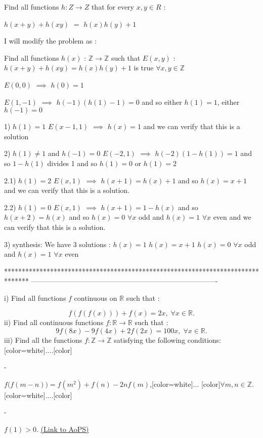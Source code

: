\begin{solution}
	\begin{tcolorbox}Find all functions $ h : Z \longrightarrow Z$ that for every $ x,y \in R$ :

$ h(x + y) + h(xy)$ $ =$ $ h(x)h(y) + 1$\end{tcolorbox}

I will modify the problem as :

Find all functions $ h(x)$ : $ \mathbb{Z}\longrightarrow\mathbb{Z}$ such that $ E(x,y)$ : $ h(x + y) + h(xy) = h(x)h(y) + 1$ is true $ \forall x,y\in\mathbb{Z}$

$ E(0,0)$ $ \implies$ $ h(0) = 1$

$ E(1, - 1)$ $ \implies$ $ h( - 1)(h(1) - 1) = 0$ and so either $ h(1) = 1$, either $ h( - 1) = 0$

1) $ h(1) = 1$
$ E(x - 1,1)$ $ \implies$ $ h(x) = 1$ and we can verify that this is a solution

2) $ h(1)\neq 1$ and $ h( - 1) = 0$
$ E( - 2,1)$ $ \implies$ $ h( - 2)(1 - h(1)) = 1$ and so $ 1 - h(1)$ divides 1 and so $ h(1) = 0$ or $ h(1) = 2$

2.1) $ h(1) = 2$
$ E(x,1)$ $ \implies$ $ h(x + 1) = h(x) + 1$ and so $ h(x) = x + 1$ and we can verify that this is a solution.

2.2) $ h(1) = 0$
$ E(x,1)$ $ \implies$ $ h(x + 1) = 1 - h(x)$ and so $ h(x + 2) = h(x)$ and so $ h(x) = 0$ $ \forall x$ odd and $ h(x) = 1$ $ \forall x$ even and we can verify that this is a solution.

3) synthesis:
We have 3 solutions :
$ h(x) = 1$
$ h(x) = x + 1$
$ h(x) = 0$ $ \forall x$ odd and $ h(x) = 1$ $ \forall x$ even
\end{solution}
*******************************************************************************
-------------------------------------------------------------------------------

\begin{problem}
	i) Find all functions $ f$ continuous on $ \mathbb{R}$ such that :

\[ f ( f ( f (x))) + f (x) = 2x, \;\forall x \in \mathbb{R}.\]
ii) Find all continuous functions $ f : \mathbb{R} \to \mathbb{R}$ such that :
\[ 9 f (8x) - 9 f (4x) + 2 f (2x) = 100x, \;\forall x \in \mathbb{R}.\]
iii) Find all the functions $ f : \mathbb{Z} \to \mathbb{Z}$ satisfying the following conditions:
[color=white]....[\/color]\begin{bolded}-\end{bolded} $ f \big( f (m - n)\big) = f (m^2) + f (n) - 2n f (m)$,[color=white]... [\/color]$ \forall m, n \in \mathbb{Z}$.
[color=white]....[\/color]\begin{bolded}-\end{bolded} $ f (1) > 0$.
	\flushright \href{https://artofproblemsolving.com/community/c6h272657}{(Link to AoPS)}
\end{problem}




